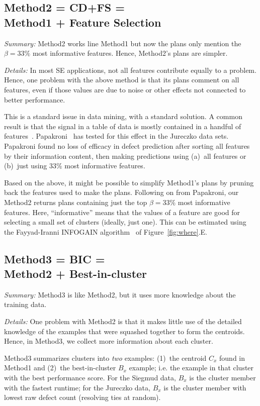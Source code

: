 \documentclass{sig-alternate}
\newcommand{\fig}[1]{Figure~\ref{fig:#1}}
\begin{document}
\subsection{Method2 =  CD+FS = \\ Method1  + Feature Selection }
 
{\em Summary:} Method2 works line Method1 but now the   plans  only
mention the $\beta=33\%$ most informative features. Hence, Method2's plans are simpler.

{\em Details:} In most SE applications, not all features contribute equally to a problem.  Hence, one problem
with the above method is that its plans comment on all features, even if those values are due
to noise or other effects not connected to better performance.

This is a standard issue in data mining, with a standard solution.
A common result is that the signal in a table of data is mostly contained in a handful of features~\cite{hall03,kohavi97}.
Papakroni~\cite{papa13} has tested for this effect in the Jureczko data sets.
Papakroni found no loss of   efficacy in defect prediction after
sorting all features by their information content,
then making predictions using (a)~all  features or (b)~just using   33\% most informative features.

Based on the above, it might be possible to simplify Method1's plans by pruning back the features used to make
the plans. Following on from Papakroni, our Method2 returns plans
containing just the top $\beta=33\%$ most informative features. Here, ``informative'' means
that the values of a feature are good for selecting a small set of clusters (ideally,
just one).
This can be estimated using the Fayyad-Iranni INFOGAIN algorithm~\cite{FayIra93Multi}
of \fig{where}.E.


\subsection{Method3 = BIC = \\  Method2 + Best-in-cluster}\label{sect:BIC}

{\em Summary:} Method3 is like Method2, but it uses more knowledge about the training data.

{\em Details:}
One problem with Method2 is that it makes little use of the detailed knowledge
of the examples that were squashed together to form the centroids. 
Hence,
in Method3, we collect more information about each cluster.

Method3 summarizes clusters into {\em two} examples: (1)~the centroid $C_x$ found in Method1 and
(2)~the best-in-cluster $B_x$  example; i.e. the  example in that cluster
with the best performance score. 
For the Siegmud data, $B_x$ is the cluster member with the fastest runtime;
for the Jureczko data, $B_x$  is the cluster member with lowest raw defect count
(resolving ties at random).
\end{document}
